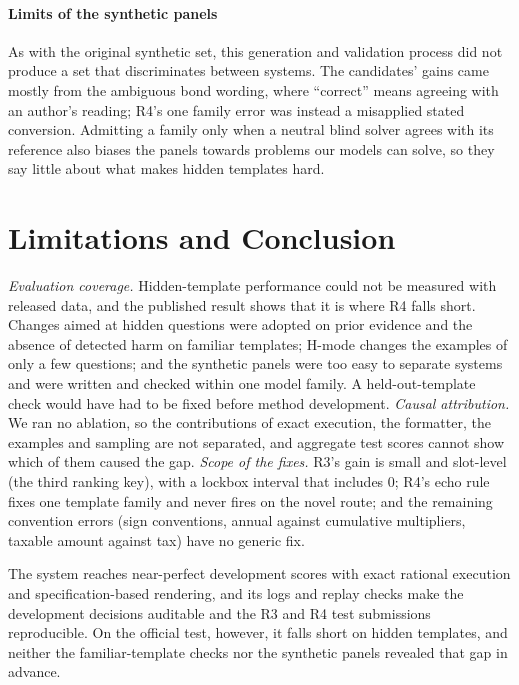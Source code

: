 \documentclass[conference]{IEEEtran}
\begin{document}
\paragraph*{Limits of the synthetic panels} As with the original synthetic set, this generation and validation process did not produce a set that discriminates between systems. The candidates' gains came mostly from the ambiguous bond wording, where ``correct'' means agreeing with an author's reading; R4's one family error was instead a misapplied stated conversion. Admitting a family only when a neutral blind solver agrees with its reference also biases the panels towards problems our models can solve, so they say little about what makes hidden templates hard.

\section{Limitations and Conclusion}
\emph{Evaluation coverage.} Hidden-template performance could not be measured with released data, and the published result shows that it is where R4 falls short. Changes aimed at hidden questions were adopted on prior evidence and the absence of detected harm on familiar templates; H-mode changes the examples of only a few questions; and the synthetic panels were too easy to separate systems and were written and checked within one model family. A held-out-template check would have had to be fixed before method development. \emph{Causal attribution.} We ran no ablation, so the contributions of exact execution, the formatter, the examples and sampling are not separated, and aggregate test scores cannot show which of them caused the gap. \emph{Scope of the fixes.} R3's gain is small and slot-level (the third ranking key), with a lockbox interval that includes 0; R4's echo rule fixes one template family and never fires on the novel route; and the remaining convention errors (sign conventions, annual against cumulative multipliers, taxable amount against tax) have no generic fix.

The system reaches near-perfect development scores with exact rational execution and specification-based rendering, and its logs and replay checks make the development decisions auditable and the R3 and R4 test submissions reproducible. On the official test, however, it falls short on hidden templates, and neither the familiar-template checks nor the synthetic panels revealed that gap in advance.
\end{document}
